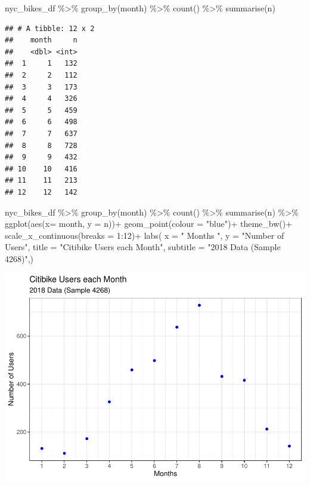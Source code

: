 \documentclass[
]{article}
\newenvironment{Shaded}{\begin{snugshade}}{\end{snugshade}}
\newcommand{\AttributeTok}[1]{\textcolor[rgb]{0.77,0.63,0.00}{#1}}
\newcommand{\DecValTok}[1]{\textcolor[rgb]{0.00,0.00,0.81}{#1}}
\newcommand{\FunctionTok}[1]{\textcolor[rgb]{0.00,0.00,0.00}{#1}}
\newcommand{\NormalTok}[1]{#1}
\newcommand{\SpecialCharTok}[1]{\textcolor[rgb]{0.00,0.00,0.00}{#1}}
\newcommand{\StringTok}[1]{\textcolor[rgb]{0.31,0.60,0.02}{#1}}
\begin{document}
\begin{Shaded}
\begin{Highlighting}[]
\NormalTok{nyc\_bikes\_df }\SpecialCharTok{\%\textgreater{}\%}
  \FunctionTok{group\_by}\NormalTok{(month) }\SpecialCharTok{\%\textgreater{}\%}
  \FunctionTok{count}\NormalTok{() }\SpecialCharTok{\%\textgreater{}\%}
  \FunctionTok{summarise}\NormalTok{(n) }
\end{Highlighting}
\end{Shaded}

\begin{verbatim}
## # A tibble: 12 x 2
##    month     n
##    <dbl> <int>
##  1     1   132
##  2     2   112
##  3     3   173
##  4     4   326
##  5     5   459
##  6     6   498
##  7     7   637
##  8     8   728
##  9     9   432
## 10    10   416
## 11    11   213
## 12    12   142
\end{verbatim}

\begin{Shaded}
\begin{Highlighting}[]
\NormalTok{nyc\_bikes\_df }\SpecialCharTok{\%\textgreater{}\%}
  \FunctionTok{group\_by}\NormalTok{(month) }\SpecialCharTok{\%\textgreater{}\%}
  \FunctionTok{count}\NormalTok{() }\SpecialCharTok{\%\textgreater{}\%}
  \FunctionTok{summarise}\NormalTok{(n) }\SpecialCharTok{\%\textgreater{}\%}
\FunctionTok{ggplot}\NormalTok{(}\FunctionTok{aes}\NormalTok{(}\AttributeTok{x=}\NormalTok{ month, }\AttributeTok{y =}\NormalTok{ n))}\SpecialCharTok{+}
  \FunctionTok{geom\_point}\NormalTok{(}\AttributeTok{colour =} \StringTok{"blue"}\NormalTok{)}\SpecialCharTok{+}
  \FunctionTok{theme\_bw}\NormalTok{()}\SpecialCharTok{+}
  \FunctionTok{scale\_x\_continuous}\NormalTok{(}\AttributeTok{breaks =} \DecValTok{1}\SpecialCharTok{:}\DecValTok{12}\NormalTok{)}\SpecialCharTok{+}
  \FunctionTok{labs}\NormalTok{(}
    \AttributeTok{x =} \StringTok{" Months "}\NormalTok{,}
    \AttributeTok{y =} \StringTok{"Number of Users"}\NormalTok{,}
    \AttributeTok{title =} \StringTok{"Citibike Users each Month"}\NormalTok{,}
    \AttributeTok{subtitle =} \StringTok{"2018 Data (Sample 4268)"}\NormalTok{,)}
\end{Highlighting}
\end{Shaded}

\includegraphics{nyc_bikes_presentation_janehogg_files/figure-latex/unnamed-chunk-12-1.pdf}
\end{document}
